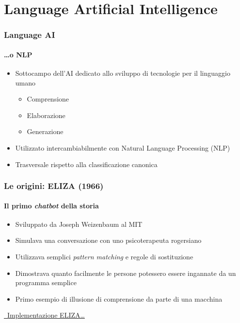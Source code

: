 \section{Language Artificial Intelligence} %
\label{sec:language_ai}
%
\begin{frame}[t,fragile] \frametitle{Language AI}
    \framesubtitle{\ldots o NLP}
	{\small
	    \begin{minipage}[t]{\textwidth}
	    	\begin{itemize}[leftmargin=10pt,align=right]
				\onslide<1->\item[\alert{\faHandORight}] Sottocampo dell'AI dedicato allo sviluppo di tecnologie per il linguaggio umano
				\begin{itemize}[leftmargin=10pt,align=right]
					\item[\alert{\faHandORight}] Comprensione
					\item[\alert{\faHandORight}] Elaborazione
					\item[\alert{\faHandORight}] Generazione
				\end{itemize}
				\item[\alert{\faHandORight}] Utilizzato intercambiabilmente con \alert{Natural Language Processing} (NLP)
				\onslide<3->\item[\alert{\faExclamationTriangle}] \alert{Trasversale} rispetto alla classificazione canonica
			\end{itemize}
	    \end{minipage}
	}
\end{frame}
%
\begin{frame}[t,fragile] \frametitle{Le origini: ELIZA (1966)}
    \framesubtitle{Il primo \textit{chatbot} della storia}
	{\small
	    \begin{minipage}[t]{\textwidth}
	    	\begin{itemize}[leftmargin=10pt,align=right]
				\onslide<1->\item[\alert{\faHandORight}] Sviluppato da \alert{Joseph Weizenbaum} al MIT
				\onslide<2->\item[\alert{\faHandORight}] Simulava una conversazione con uno \alert{psicoterapeuta} rogersiano
				\onslide<3->\item[\alert{\faHandORight}] Utilizzava semplici \alert{\textit{pattern matching}} e regole di sostituzione
				\onslide<4->\item[\alert{\faHandORight}] Dimostrava quanto facilmente le persone potessero essere \alert{ingannate} da un programma semplice
				\onslide<5->\item[\alert{\faHandORight}] Primo esempio di \alert{illusione di comprensione} da parte di una macchina
			\end{itemize}
        \end{minipage}
		\vfill
		\begin{center}
			\href{https://www.masswerk.at/elizabot/eliza.html}{\faLink\ Implementazione ELIZA\ldots}
		\end{center}
	}
\end{frame}
